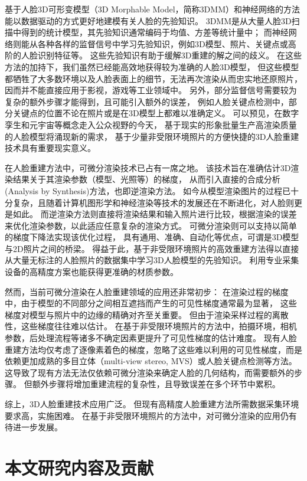 基于人脸3D可形变模型（3D Morphable Model，简称3DMM）和神经网络的方法能以数据驱动的方式更好地建模有关人脸的先验知识。
3DMM是从大量人脸3D扫描中得到的统计模型，其先验知识通常编码于均值、方差等统计量中；
而神经网络则能从各种各样的监督信号中学习先验知识，例如3D模型、照片、关键点或高阶的人脸识别特征等。
这些先验知识有助于缓解3D重建的解之间的歧义。
在这些方法的加持下，我们虽然已经能高效地获得较为准确的人脸3D模型，
但这些模型都牺牲了大多数环境以及人脸表面上的细节，无法再次渲染从而忠实地还原照片，
因而并不能直接应用于影视，游戏等工业领域中。
另外，部分监督信号需要较为复杂的额外步骤才能得到，且可能引入额外的误差，
例如人脸关键点检测中，部分关键点的位置不论在照片或是在3D模型上都难以准确定义。
可以预见，在数字孪生和元宇宙等概念走入公众视野的今天，
基于现实的形象批量生产高渲染质量的人脸模型将涌现新的需求，
基于少量非受限环境照片的方便快捷的3D人脸重建技术具有重要现实意义。

在人脸重建方法中，可微分渲染技术已占有一席之地。
该技术旨在准确估计3D渲染结果关于其渲染参数（模型、光照等）的梯度，
从而引入直接的合成分析(Analysis by Synthesis)方法，也即逆渲染方法。
如今从模型渲染图片的过程已十分复杂，且随着计算机图形学和神经渲染等技术的发展还在不断进化，对人脸则更是如此。
而逆渲染方法则直接将渲染结果和输入照片进行比较，根据渲染的误差来优化渲染参数，以此适应任意复杂的渲染方式。
可微分渲染则可以支持以简单的梯度下降法实现该优化过程，
具有通用、准确、自动化等优点，可谓是3D模型与2D照片之间的桥梁。
得益于此，基于非受限环境照片的高效重建方法得以直接从大量无标注的人脸照片的数据集中学习3D人脸模型的先验知识。
利用专业采集设备的高精度方案也能获得更准确的材质参数。

然而，当前可微分渲染在人脸重建领域的应用还非常初步：
在渲染过程的梯度中，由于模型的不同部分之间相互遮挡而产生的可见性梯度通常最为显著，
这些梯度对模型与照片中的边缘的精确对齐至关重要。
但由于渲染采样过程的离散性，这些梯度往往难以估计。
在基于非受限环境照片的方法中，拍摄环境，相机参数，后处理流程等诸多不确定因素更提升了可见性梯度的估计难度。
现有人脸重建方法均仅考虑了逐像素着色的梯度，忽略了这些难以利用的可见性梯度，而是依赖更加成熟的多目立体（multi-view stereo, MVS）或人脸关键点检测等方法。
这导致了现有方法无法仅依赖可微分渲染来确定人脸的几何结构，而需要额外的步骤。
但额外步骤将增加重建流程的复杂性，且导致误差在多个环节中累积。

综上，3D人脸重建技术应用广泛。
但现有高精度人脸重建方法所需数据采集环境要求高，实施困难。
在基于非受限环境照片的方法中，对可微分渲染的应用仍有待进一步发展。

\section{本文研究内容及贡献}

